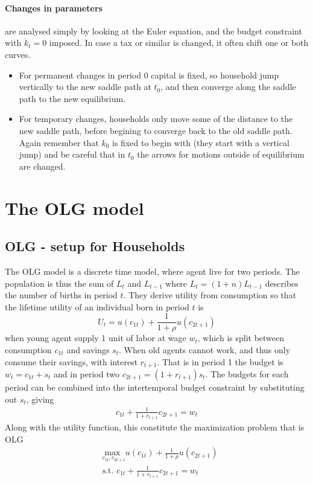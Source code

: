 \documentclass[12pt, a4paper]{article}
\begin{document}
\begin{spacing}{1.213}
\paragraph{Changes in parameters}  are analysed simply by looking at the Euler equation, and the budget constraint with $\dot{k}_t = 0$ imposed. In case a tax or similar is changed, it often shift one or both curves.
\begin{itemize}
\item For permanent changes in period $0$ capital is fixed, so household jump vertically to the new saddle path at $t_0$, and then converge along the saddle path to the new equilibrium.
\item For temporary changes, households only move some of the distance to the new saddle path, before begining to converge back to the old saddle path. Again remember that $k_0$ is fixed to begin with (they start with a vertical jump) and be careful that in $t_0$ the arrows for motions outside of equilibrium are changed. 
\end{itemize}

\section{The OLG model}
\subsection{OLG - setup for Households}
The OLG model is a discrete time model, where agent live for two periods. The population is thus the sum of $L_t$ and $L_{t-1}$ where $L_t = (1+n)L_{t-1}$ describes the number of births in period $t$. They derive utility from consumption so that the lifetime utility of an individual born in period $t$ is 
\begin{equation}
U_t = u(c_{1t}) + \frac{1}{1+ \rho} u(c_{2t+1})
\end{equation}
when young agent supply 1 unit of labor at wage $w_t$, which is split between consumption $c_{1t}$ and savings $s_t$. When old agents cannot work, and thus only consume their savings, with interest $r_{t+1}$. That is in period 1 the budget is $w_t = c_{1t} + s_t$ and in period two $c_{2t+1} = (1+r_{t+1})s_t$. The budgets for each period can be combined into the intertemporal budget constraint by substituting out $s_t$, giving
\begin{align}
c_{1t} + \frac{1}{1+ r_{t+1}} c_{2t+1} = w_t
\end{align}
Along with the utility function, this constitute the maximization problem that is OLG
\begin{align*}
& \underset{c_{1t},c_{2t+1}}{\textrm{max }} u(c_{1t}) + \frac{1}{1+ \rho} u(c_{2t+1}) \\
& \textrm{s.t. } c_{1t} + \frac{1}{1+ r_{t+1}} c_{2t+1} = w_t
\end{align*}


\end{spacing}
\end{document}
